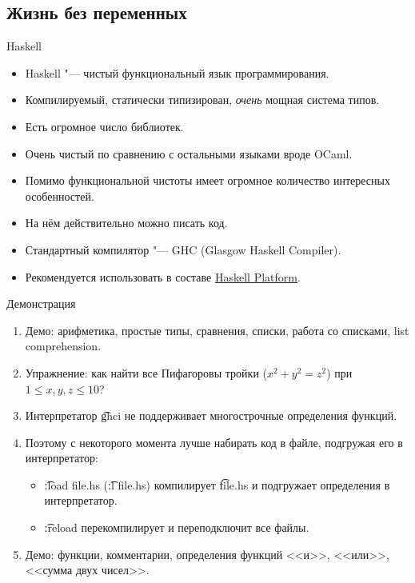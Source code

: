 \subsection{Жизнь без переменных}

\begin{frame}{Haskell}
	\begin{itemize}
		\item Haskell "--- чистый функциональный язык программирования.
		\item Компилируемый, статически типизирован, \textit{очень} мощная система типов.
		\item Есть огромное число библиотек.
		\item Очень чистый по сравнению с остальными языками вроде OCaml.
		\item Помимо функциональной чистоты имеет огромное количество интересных особенностей.
		\item На нём действительно можно писать код.
		\item Стандартный компилятор "--- GHC (Glasgow Haskell Compiler).
		\item Рекомендуется использовать в составе \href{https://www.haskell.org/platform/}{Haskell Platform}.
	\end{itemize}
\end{frame}

\begin{frame}{Демонстрация}
	\begin{enumerate}
		\item Демо: арифметика, простые типы, сравнения, списки, работа со списками, list comprehension.
		\item Упражнение: как найти все Пифагоровы тройки ($x^2 + y^2 = z^2$) при $1 \le x, y, z \le 10$?
		\item Интерпретатор \t{ghci} не поддерживает многострочные определения функций.
		\item Поэтому с некоторого момента лучше набирать код в файле, подгружая его в интерпретатор:
			\begin{itemize}
				\item \t{:load file.hs} (\t{:l file.hs}) компилирует \t{file.hs} и подгружает определения в интерпретатор.
				\item \t{:reload} перекомпилирует и переподключит все файлы.
			\end{itemize}
		\item Демо: функции, комментарии, определения функций <<и>>, <<или>>, <<сумма двух чисел>>.
	\end{enumerate}
\end{frame}

